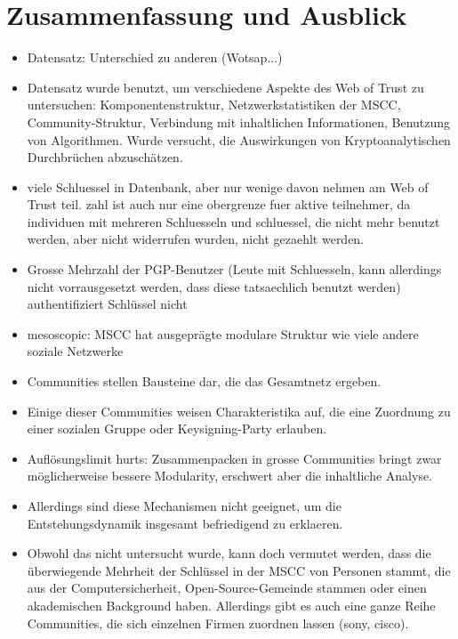 
\chapter{Zusammenfassung und Ausblick}
\label{ch:Zusammenfassung}

\begin{itemize}

\item Datensatz: Unterschied zu anderen (Wotsap...)

\item Datensatz wurde benutzt, um verschiedene Aspekte des Web of
  Trust zu untersuchen: Komponentenstruktur, Netzwerkstatistiken der
  MSCC, Community-Struktur, Verbindung mit inhaltlichen Informationen,
  Benutzung von Algorithmen. Wurde versucht, die Auswirkungen von
  Kryptoanalytischen Durchbr\"uchen abzusch\"atzen.

\item viele Schluessel in Datenbank, aber nur wenige davon nehmen am
  Web of Trust teil. zahl ist auch nur eine obergrenze fuer aktive
  teilnehmer, da individuen mit mehreren Schluesseln und schluessel,
  die nicht mehr benutzt werden, aber nicht widerrufen wurden, nicht
  gezaehlt werden.
\item Grosse Mehrzahl der PGP-Benutzer (Leute mit Schluesseln,
  kann allerdings nicht vorrausgesetzt werden, dass diese tatsaechlich
  benutzt werden) authentifiziert Schl\"ussel nicht
\item mesoscopic: MSCC hat ausgepr\"agte modulare Struktur wie viele andere
  soziale Netzwerke
\item Communities stellen Bausteine dar, die das Gesamtnetz ergeben.
\item Einige dieser Communities weisen Charakteristika auf, die eine
  Zuordnung zu einer sozialen Gruppe oder Keysigning-Party erlauben.
\item Aufl\"osungslimit hurts: Zusammenpacken in grosse Communities
  bringt zwar m\"oglicherweise bessere Modularity, erschwert aber die
  inhaltliche Analyse.
\item Allerdings sind diese Mechanismen nicht geeignet, um die
  Entstehungsdynamik insgesamt befriedigend zu erklaeren.
\item Obwohl das nicht untersucht wurde, kann doch vermutet werden,
  dass die \"uberwiegende Mehrheit der Schl\"ussel in der MSCC von
  Personen stammt, die aus der Computersicherheit,  Open-Source-Gemeinde stammen oder einen
  akademischen Background haben. Allerdings gibt es auch eine ganze
  Reihe Communities, die sich einzelnen Firmen zuordnen lassen (sony,
  cisco). 

\end{itemize}

